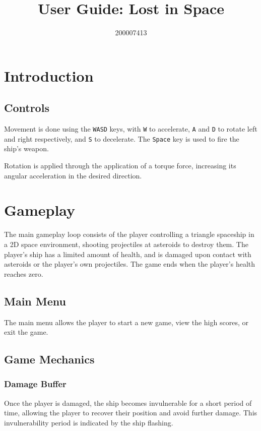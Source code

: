 \documentclass[12pt, a4paper]{article}
\title{User Guide: Lost in Space}
\author{200007413}
\date{}
\begin{document}
{\bfseries\huge\thetitle}

{\large\theauthor}

\section{Introduction}


\subsection{Controls}

Movement is done using the \texttt{WASD} keys, with \texttt{W} to accelerate, \texttt{A} and \texttt{D} to rotate left and right respectively, and \texttt{S} to decelerate. The \texttt{Space} key is used to fire the ship's weapon.

Rotation is applied through the application of a torque force, increasing its angular acceleration in the desired direction.


\section{Gameplay}

The main gameplay loop consists of the player controlling a triangle spaceship in a 2D space environment, shooting projectiles at asteroids to destroy them. The player's ship has a limited amount of health, and is damaged upon contact with asteroids or the player's own projectiles. The game ends when the player's health reaches zero.

\subsection{Main Menu}

The main menu allows the player to start a new game, view the high scores, or exit the game.

\subsection{Game Mechanics}

\subsubsection{Damage Buffer}

Once the player is damaged, the ship becomes invulnerable for a short period of time, allowing the player to recover their position and avoid further damage. This invulnerability period is indicated by the ship flashing.
\end{document}
